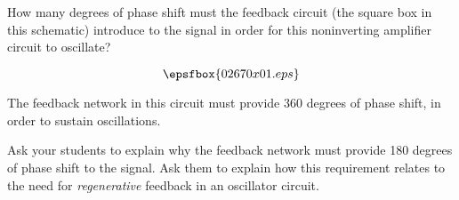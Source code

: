 

How many degrees of phase shift must the feedback circuit (the square box in this schematic) introduce to the signal in order for this noninverting amplifier circuit to oscillate?

$$\epsfbox{02670x01.eps}$$







The feedback network in this circuit must provide 360 degrees of phase shift, in order to sustain oscillations.  







Ask your students to explain why the feedback network must provide 180 degrees of phase shift to the signal.  Ask them to explain how this requirement relates to the need for {\it regenerative} feedback in an oscillator circuit.




